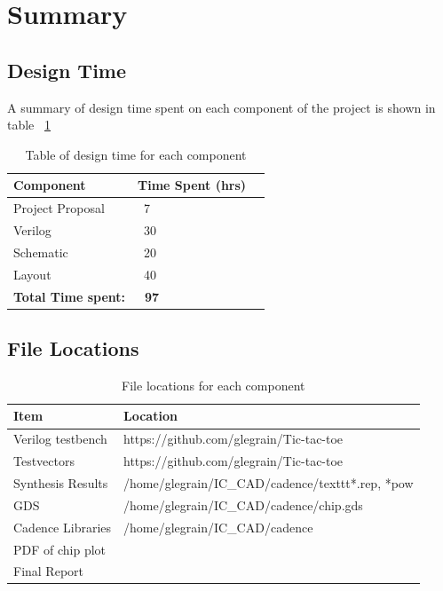\documentclass[]{article}
\begin{document}
\section{Summary}
\label{sec:summary}


\subsection{Design Time}
\label{sec:designtime}
A summary of design time spent on each component of the project is shown in table ~\ref{tab:designtime}

\begin{table}
\centering
\caption{Table of design time for each component}
\begin{tabular}{ | l | l | l |}
\hline
    Component             & Time Spent (hrs) \\
\hline
    Project Proposal        & ~7 \\
\hline
    Verilog                 & ~30\\
\hline
    Schematic               & ~20\\
\hline
    Layout                  & ~40\\
\hline
    \textbf{Total Time spent:}& \textbf{~97} \\
\hline
\end{tabular}

\label{tab:designtime}
\end{table}
\subsection{File Locations}
\label{sec:filelocations}
\begin{table}
\centering
\caption{File locations for each component}
\begin{tabular}{ |p{3cm} | l |}
\hline
    Item                & Location \\
\hline
    Verilog testbench   & https://github.com/glegrain/Tic-tac-toe\\
\hline
    Testvectors         & https://github.com/glegrain/Tic-tac-toe\\
\hline
    Synthesis Results   & /home/glegrain/IC\_CAD/cadence/texttt{*.rep, *pow}\\
\hline
    GDS                 & /home/glegrain/IC\_CAD/cadence/chip.gds\\
\hline
    Cadence Libraries   & /home/glegrain/IC\_CAD/cadence\\
\hline
    PDF of chip plot    &\\ 
\hline
    Final Report        & \\
\hline  
\end{tabular}

\label{tab:filelocations}
\end{table}
\end{document}
